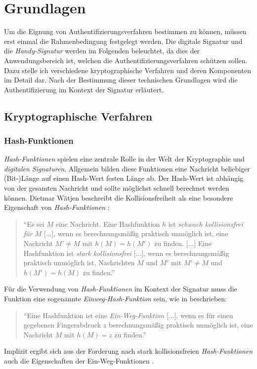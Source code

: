 \documentclass[11pt,a4paper,ngerman]{scrreprt}
\begin{document}
\chapter{Grundlagen}
Um die Eignung von Authentifizierungsverfahren bestimmen zu können, müssen erst einmal die Rahmenbedingung festgelegt werden. Die digitale Signatur und die \textit{Handy-Signatur} werden im Folgenden beleuchtet, da dies der Anwendungsbereich ist, welchen die Authentifizierungsverfahren schützen sollen. Dazu stelle ich verschiedene kryptographische Verfahren und deren Komponenten im Detail dar. Nach der Bestimmung dieser technischen Grundlagen wird die Authentifizierung im Kontext der Signatur erläutert.

\section{Kryptographische Verfahren}
\subsection{Hash-Funktionen}\label{sec:Hash-Funktionen}
\textit{Hash-Funktionen} spielen eine zentrale Rolle in der Welt der Kryptographie und \textit{digitalen Signaturen}. Allgemein bilden diese Funktionen eine Nachricht beliebiger (Bit-)Länge auf einen Hash-Wert festen Länge ab. Der Hash-Wert ist abhängig von der gesamten Nachricht und sollte möglichst schnell berechnet werden können. Dietmar Wätjen beschreibt die Kollisionsfreiheit als eine besondere Eigenschaft von \textit{Hash-Funktionen} \cite[S. 89]{krypt08}: 
\begin{quote}
    ``Es sei $M$ eine Nachricht. Eine Hashfunktion $h$ ist \emph{schwach kollisionsfrei für $M$} [...], wenn es berechnungsmäßig praktisch unmöglich ist, eine Nachricht $M' \neq M$ mit $h(M) = h(M')$ zu finden. [...]
    Eine Hashfunktion ist \emph{stark kollisionsfrei} [...], wenn es berechnungsmäßig praktisch unmöglich ist, Nachrichten $M$ und $M'$ mit $M' \neq M$ und $h(M') = h(M)$ zu finden.''
\end{quote}
Für die Verwendung von \emph{Hash-Funktionen} im Kontext der Signatur muss die Funktion eine sogenannte \emph{Einweg-Hash-Funktion} sein, wie in \cite[S. 99]{krypt08} beschrieben:
\begin{quote}
    ``Eine Hashfunktion ist eine \emph{Ein-Weg-Funktion} [...], wenn es für einen gegebenen Fingerabdruck $z$ berechnungsmäßig praktisch unmöglich ist, eine Nachricht $M$ mit $h(M)=z$ zu finden.''
\end{quote}
Implizit ergibt sich aus der Forderung nach stark kollisionsfreien \textit{Hash-Funktionen} auch die Eigenschaften der Ein-Weg-Funktionen \cite[S. 99]{krypt08}.
\end{document}
